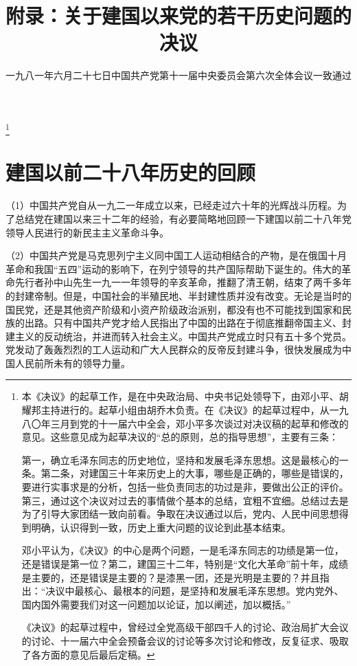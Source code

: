 
\title{附录：关于建国以来党的若干历史问题的决议}
\date{一九八一年六月二十七日中国共产党第十一届中央委员会第六次全体会议一致通过}
\thanks{本《决议》的起草工作，是在中央政治局、中央书记处领导下，由邓小平、胡耀邦主持进行的。起草小组由胡乔木负责。在《决议》的起草过程中，从一九八〇年三月到党的十一届六中全会，邓小平多次谈过对决议稿的起草和修改的意见。这些意见成为起草决议的“总的原则，总的指导思想”，主要有三条：

第一，确立毛泽东同志的历史地位，坚持和发展毛泽东思想。这是最核心的一条。第二条，对建国三十年来历史上的大事，哪些是正确的，哪些是错误的，要进行实事求是的分析，包括一些负责同志的功过是非，要做出公正的评价。第三，通过这个决议对过去的事情做个基本的总结，宜粗不宜细。总结过去是为了引导大家团结一致向前看。争取在决议通过以后，党内、人民中间思想得到明确，认识得到一致，历史上重大问题的议论到此基本结束。

邓小平认为，《决议》的中心是两个问题，一是毛泽东同志的功绩是第一位，还是错误是第一位？第二，建国三十二年，特别是“文化大革命”前十年，成绩是主要的，还是错误是主要的？是漆黑一团，还是光明是主要的？并且指出：“决议中最核心、最根本的问题，是坚持和发展毛泽东思想。党内党外、国内国外需要我们对这一问题加以论证，加以阐述，加以概括。”

《决议》的起草过程中，曾经过全党高级干部四千人的讨论、政治局扩大会议的讨论、十一届六中全会预备会议的讨论等多次讨论和修改，反复征求、吸取了各方面的意见后最后定稿。}
\maketitle


\section{建国以前二十八年历史的回顾}

（1）中国共产党自从一九二一年成立以来，已经走过六十年的光辉战斗历程。为了总结党在建国以来三十二年的经验，有必要简略地回顾一下建国以前二十八年党领导人民进行的新民主主义革命斗争。

（2）中国共产党是马克思列宁主义同中国工人运动相结合的产物，是在俄国十月革命和我国“五四”运动的影响下，在列宁领导的共产国际帮助下诞生的。伟大的革命先行者孙中山先生一九一一年领导的辛亥革命，推翻了清王朝，结束了两千多年的封建帝制。但是，中国社会的半殖民地、半封建性质并没有改变。无论是当时的国民党，还是其他资产阶级和小资产阶级政治派别，都没有也不可能找到国家和民族的出路。只有中国共产党才给人民指出了中国的出路在于彻底推翻帝国主义、封建主义的反动统治，并进而转入社会主义。中国共产党成立时只有五十多个党员。党发动了轰轰烈烈的工人运动和广大人民群众的反帝反封建斗争，很快发展成为中国人民前所未有的领导力量。

